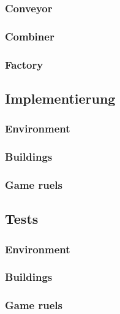 \subsubsection*{Conveyor}
\subsubsection*{Combiner}
\subsubsection*{Factory}


\subsection{Implementierung}

\subsubsection*{Environment}

\subsubsection*{Buildings}

\subsubsection*{Game ruels}



\subsection{Tests}

\subsubsection*{Environment}

\subsubsection*{Buildings}

\subsubsection*{Game ruels}
